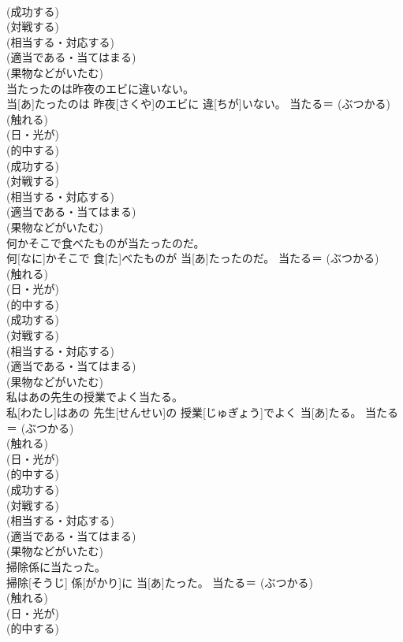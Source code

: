 \documentclass[8pt]{extreport}
\begin{document}
\begin{CJK}{UTF8}{min}
{\\	(成功する) 
\\	(対戦する) 
\\	(相当する・対応する) 
\\	(適当である・当てはまる) 
\\	(果物などがいたむ)
\\	当たったのは昨夜のエビに違いない。	
\\	当[あ]たったのは 昨夜[さくや]のエビに 違[ちが]いない。	当たる＝ (ぶつかる) 
\\	(触れる) 
\\	(日・光が) 
\\	(的中する) 
\\	(成功する) 
\\	(対戦する) 
\\	(相当する・対応する) 
\\	(適当である・当てはまる) 
\\	(果物などがいたむ)
\\	何かそこで食べたものが当たったのだ。	
\\	何[なに]かそこで 食[た]べたものが 当[あ]たったのだ。	当たる＝ (ぶつかる) 
\\	(触れる) 
\\	(日・光が) 
\\	(的中する) 
\\	(成功する) 
\\	(対戦する) 
\\	(相当する・対応する) 
\\	(適当である・当てはまる) 
\\	(果物などがいたむ)
\\	私はあの先生の授業でよく当たる。	
\\	私[わたし]はあの 先生[せんせい]の 授業[じゅぎょう]でよく 当[あ]たる。	当たる＝ (ぶつかる) 
\\	(触れる) 
\\	(日・光が) 
\\	(的中する) 
\\	(成功する) 
\\	(対戦する) 
\\	(相当する・対応する) 
\\	(適当である・当てはまる) 
\\	(果物などがいたむ)
\\	掃除係に当たった。	
\\	掃除[そうじ] 係[がかり]に 当[あ]たった。	当たる＝ (ぶつかる) 
\\	(触れる) 
\\	(日・光が) 
\\	(的中する) 
}
\end{CJK}
\end{document}
